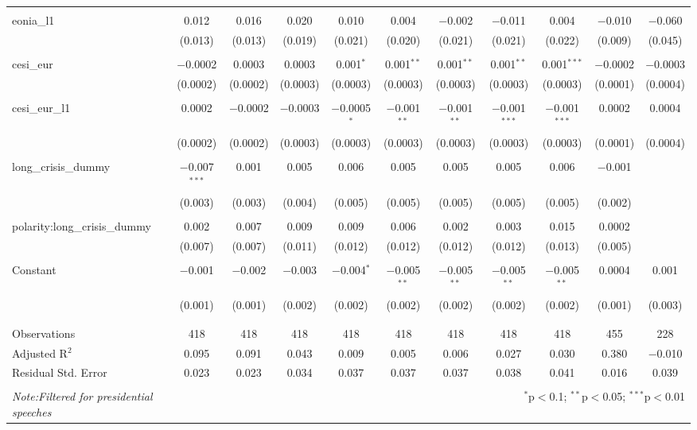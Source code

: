 \begin{table}[!htbp]
\begin{adjustbox}{width=1.35\textwidth}
\begin{tabular}{@{\extracolsep{5pt}}lcccccccccc}
  & & & & & & & & & & \\ 
 eonia\_l1 & 0.012 & 0.016 & 0.020 & 0.010 & 0.004 & $-$0.002 & $-$0.011 & 0.004 & $-$0.010 & $-$0.060 \\ 
  & (0.013) & (0.013) & (0.019) & (0.021) & (0.020) & (0.021) & (0.021) & (0.022) & (0.009) & (0.045) \\ 
  & & & & & & & & & & \\ 
 cesi\_eur & $-$0.0002 & 0.0003 & 0.0003 & 0.001$^{*}$ & 0.001$^{**}$ & 0.001$^{**}$ & 0.001$^{**}$ & 0.001$^{***}$ & $-$0.0002 & $-$0.0003 \\ 
  & (0.0002) & (0.0002) & (0.0003) & (0.0003) & (0.0003) & (0.0003) & (0.0003) & (0.0003) & (0.0001) & (0.0004) \\ 
  & & & & & & & & & & \\ 
 cesi\_eur\_l1 & 0.0002 & $-$0.0002 & $-$0.0003 & $-$0.0005$^{*}$ & $-$0.001$^{**}$ & $-$0.001$^{**}$ & $-$0.001$^{***}$ & $-$0.001$^{***}$ & 0.0002 & 0.0004 \\ 
  & (0.0002) & (0.0002) & (0.0003) & (0.0003) & (0.0003) & (0.0003) & (0.0003) & (0.0003) & (0.0001) & (0.0004) \\ 
  & & & & & & & & & & \\ 
 long\_crisis\_dummy & $-$0.007$^{***}$ & 0.001 & 0.005 & 0.006 & 0.005 & 0.005 & 0.005 & 0.006 & $-$0.001 &  \\ 
  & (0.003) & (0.003) & (0.004) & (0.005) & (0.005) & (0.005) & (0.005) & (0.005) & (0.002) &  \\ 
  & & & & & & & & & & \\ 
 polarity:long\_crisis\_dummy & 0.002 & 0.007 & 0.009 & 0.009 & 0.006 & 0.002 & 0.003 & 0.015 & 0.0002 &  \\ 
  & (0.007) & (0.007) & (0.011) & (0.012) & (0.012) & (0.012) & (0.012) & (0.013) & (0.005) &  \\ 
  & & & & & & & & & & \\ 
 Constant & $-$0.001 & $-$0.002 & $-$0.003 & $-$0.004$^{*}$ & $-$0.005$^{**}$ & $-$0.005$^{**}$ & $-$0.005$^{**}$ & $-$0.005$^{**}$ & 0.0004 & 0.001 \\ 
  & (0.001) & (0.001) & (0.002) & (0.002) & (0.002) & (0.002) & (0.002) & (0.002) & (0.001) & (0.003) \\ 
  & & & & & & & & & & \\ 
\hline \\[-1.8ex] 
Observations & 418 & 418 & 418 & 418 & 418 & 418 & 418 & 418 & 455 & 228 \\ 
Adjusted R$^{2}$ & 0.095 & 0.091 & 0.043 & 0.009 & 0.005 & 0.006 & 0.027 & 0.030 & 0.380 & $-$0.010 \\ 
Residual Std. Error & 0.023 & 0.023 & 0.034 & 0.037 & 0.037 & 0.037 & 0.038 & 0.041 & 0.016 & 0.039 \\ 
\hline 
\hline \\[-1.8ex] 
\textit{Note:Filtered for presidential speeches}  & \multicolumn{10}{r}{$^{*}$p$<$0.1; $^{**}$p$<$0.05; $^{***}$p$<$0.01} \\ 
\end{tabular} 
\end{adjustbox}
\end{table} 
